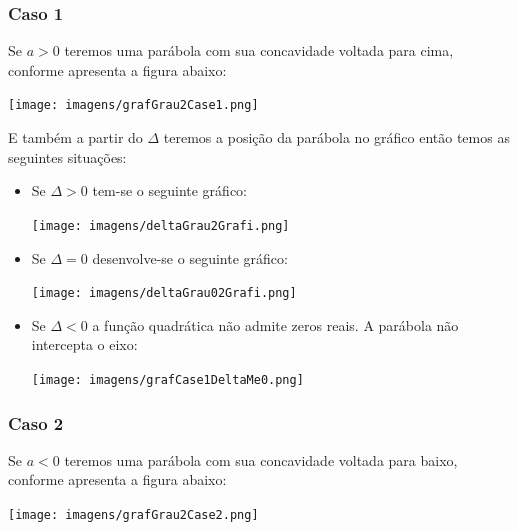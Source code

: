 \documentclass[a4paper,12pt,twoside,BCOR=10mm]{scrbook}
\begin{document}
\begin{titlepage}
\subsubsection{Caso 1}
Se $a > 0$ teremos uma parábola com sua concavidade voltada para cima, conforme apresenta a figura abaixo:\\
\begin{center}
\texttt{[image: imagens/grafGrau2Case1.png]}
\end{center}

E também a partir do $\Delta$ teremos a posição da parábola no gráfico então temos as seguintes situações:
\begin{itemize}
\item Se $\Delta > 0$ tem-se o seguinte gráfico:\\
	\begin{center}
	\texttt{[image: imagens/deltaGrau2Grafi.png]}
	\end{center}
\item Se  $\Delta = 0$ desenvolve-se o seguinte gráfico:\\
	\begin{center}
	\texttt{[image: imagens/deltaGrau02Grafi.png]}
	\end{center}
\item Se $\Delta < 0$ a função quadrática não admite zeros reais. A parábola não intercepta o eixo:\\
	\begin{center}
	\texttt{[image: imagens/grafCase1DeltaMe0.png]}
	\end{center}
\end{itemize}

\subsubsection{Caso 2}
Se $a < 0$ teremos uma parábola com sua concavidade voltada para baixo, conforme apresenta a figura abaixo:\\
\begin{center}
\texttt{[image: imagens/grafGrau2Case2.png]}
\end{center}


\end{titlepage}
\end{document}
